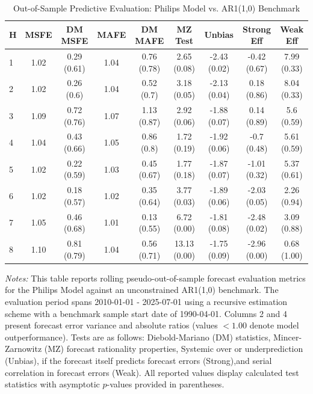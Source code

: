 \begin{table}[htbp]
\centering
\caption{Out-of-Sample Predictive Evaluation: Philips Model vs. AR1(1,0) Benchmark}
\label{tab:philips_model_evaluation}
\footnotesize
\begin{tabular}{l cccccccc}
\hline\hline
\rule{0pt}{3ex}
\textbf{H} & \textbf{MSFE} & \textbf{DM MSFE} & \textbf{MAFE} & \textbf{DM MAFE} & \textbf{MZ Test} & \textbf{Unbias} & \textbf{Strong Eff} & \textbf{Weak Eff} \\[0.5ex]
\hline
\rule{0pt}{2.5ex}
1 & 1.02 & 0.29 (0.61) & 1.04 & 0.76 (0.78) & 2.65 (0.08) & -2.43 (0.02) & -0.42 (0.67) & 7.99 (0.33) \\
2 & 1.02 & 0.26 (0.6) & 1.04 & 0.52 (0.7) & 3.18 (0.05) & -2.13 (0.04) & 0.18 (0.86) & 8.04 (0.33) \\
3 & 1.09 & 0.72 (0.76) & 1.07 & 1.13 (0.87) & 2.92 (0.06) & -1.88 (0.07) & 0.14 (0.89) & 5.6 (0.59) \\
4 & 1.04 & 0.43 (0.66) & 1.05 & 0.86 (0.8) & 1.72 (0.19) & -1.92 (0.06) & -0.7 (0.48) & 5.61 (0.59) \\
5 & 1.02 & 0.22 (0.59) & 1.03 & 0.45 (0.67) & 1.77 (0.18) & -1.87 (0.07) & -1.01 (0.32) & 5.37 (0.61) \\
6 & 1.02 & 0.18 (0.57) & 1.02 & 0.35 (0.64) & 3.77 (0.03) & -1.89 (0.06) & -2.03 (0.05) & 2.26 (0.94) \\
7 & 1.05 & 0.46 (0.68) & 1.01 & 0.13 (0.55) & 6.72 (0.00) & -1.81 (0.08) & -2.48 (0.02) & 3.09 (0.88) \\
8 & 1.10 & 0.81 (0.79) & 1.04 & 0.56 (0.71) & 13.13 (0.00) & -1.75 (0.09) & -2.96 (0.00) & 0.68 (1.00) \\
\hline\hline
\end{tabular}%
\par\smallskip
\parbox{\textwidth}{\scriptsize \textit{Notes:} This table reports rolling pseudo-out-of-sample forecast evaluation metrics for the Philips Model against an unconstrained AR1(1,0) benchmark. The evaluation period spans 2010-01-01 - 2025-07-01 using a recursive estimation scheme with a benchmark sample start date of 1990-04-01. Columns 2 and 4 present forecast error variance and absolute ratios (values $< 1.00$ denote model outperformance). Tests are as follows: Diebold-Mariano (DM) statistics, Mincer-Zarnowitz (MZ) forecast rationality properties, Systemic over or underprediction (Unbias), if the forecast itself predicts forecast errors (Strong),and serial correlation in forecast errors (Weak). All reported values display calculated test statistics with asymptotic $p$-values provided in parentheses.}
\end{table}
